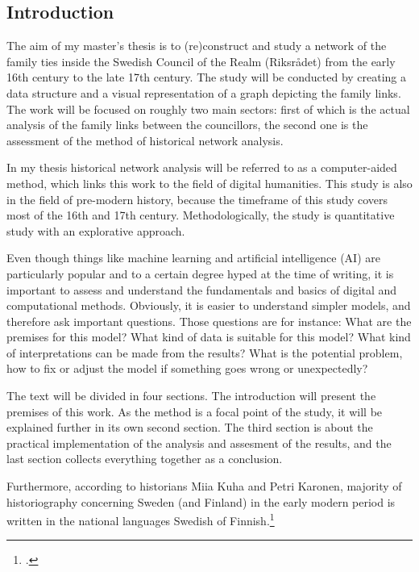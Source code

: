 \documentclass[a4paper,12pt]{article}
\begin{document}
\begin{onehalfspace} %
\section{Introduction}
The aim of my master's thesis is to (re)construct and study a network of the family ties inside the Swedish Council of the Realm (Riksrådet) from the early 16th century to the late 17th century. The study will be conducted by creating a data structure and a visual representation of a graph depicting the family links. The work will be focused on roughly two main sectors: first of which is the actual analysis of the family links between the councillors, the second one is the assessment of the method of historical network analysis. 

In my thesis historical network analysis will be referred to as a computer-aided method, which links this work to the field of digital humanities. This study is also in the field of pre-modern history, because the timeframe of this study covers most of the 16th and 17th century. Methodologically, the study is quantitative study with an explorative approach.

Even though things like machine learning and artificial intelligence (AI) are particularly popular and to a certain degree hyped at the time of writing, it is important to assess and understand the fundamentals and basics of digital and computational methods. Obviously, it is easier to understand simpler models, and therefore ask important questions. Those questions are for instance: What are the premises for this model? What kind of data is suitable for this model? What kind of interpretations can be made from the results? What is the potential problem, how to fix or adjust the model if something goes wrong or unexpectedly?

The text will be divided in four sections. The introduction will present the premises of this work. As the method is a focal point of the study, it will be explained further in its own second section. The third section is about the practical implementation of the analysis and assesment of the results, and the last section collects everything together as a conclusion. 

Furthermore, according to historians Miia Kuha and Petri Karonen, majority of historiography concerning Sweden (and Finland) in the early modern period is written in the national languages Swedish of Finnish.\footcite[p. 6.]{kuha-ja-karonen} 


\end{onehalfspace}
\end{document}
